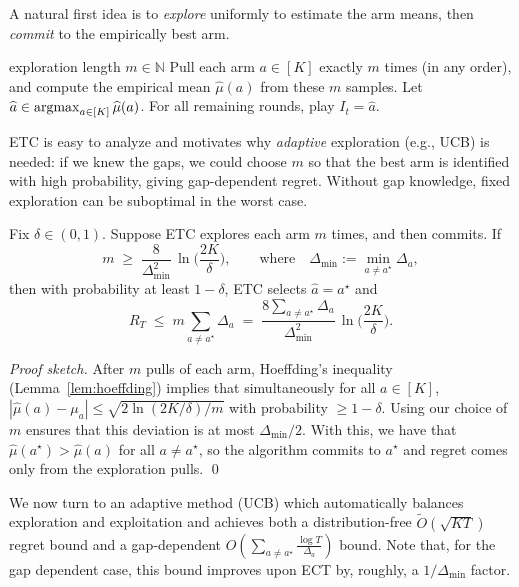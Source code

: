 A natural first idea is to \emph{explore} uniformly to estimate the arm means,
then \emph{commit} to the empirically best arm.

\begin{algorithm}[t]
\begin{algorithmic}[1]
\Require exploration length $m\in\mathbb{N}$
\State Pull each arm $a\in[K]$ exactly $m$ times (in any order), and compute the empirical mean $\widehat\mu(a)$ from these $m$ samples.
\State Let $\widehat a \in \operatorname*{argmax}_{a\in[K]}\widehat\mu(a)$.
\State For all remaining rounds, play $I_t=\widehat a$.
\end{algorithmic}
\caption{Explore--Then--Commit (ETC)}
\label{alg:etc}
\end{algorithm}

ETC is easy to analyze and motivates why \emph{adaptive} exploration (e.g., UCB)
is needed: if we knew the gaps, we could choose $m$ so that the best arm is
identified with high probability, giving gap-dependent regret. Without gap
knowledge, fixed exploration can be suboptimal in the worst case.

\begin{proposition}\label{prop:etc_gap}
Fix $\delta\in(0,1)$. Suppose ETC explores each arm $m$ times, and then commits.
If
\[
m \;\ge\; \frac{8}{\Delta_{\min}^2}\,\ln\!\Big(\frac{2K}{\delta}\Big),
\qquad\text{where}\quad
\Delta_{\min}:=\min_{a\neq a^\star}\Delta_a,
\]
then with probability at least $1-\delta$, ETC selects $\widehat a=a^\star$ and
\[
R_T \;\le\; m\sum_{a\neq a^\star}\Delta_a
\;=\;
\frac{8 \sum_{a\neq a^\star}\Delta_a}{\Delta_{\min}^2}\,\ln\!\Big(\frac{2K}{\delta}\Big).
\]
\end{proposition}

\noindent
\emph{Proof sketch.} After $m$ pulls of each arm, Hoeffding's inequality
(Lemma~\ref{lem:hoeffding}) implies that simultaneously for all $a\in[K]$,
$|\widehat\mu(a)-\mu_a|\le \sqrt{2\ln(2K/\delta)/m}$ with probability $\ge 1-\delta$.
Using our choice of $m$ ensures that this deviation is at most
$\Delta_{\min}/2$. With this, we have that $\widehat\mu(a^\star)>\widehat\mu(a)$
for all $a\neq a^\star$, so the algorithm commits to $a^\star$ and regret comes only
from the exploration pulls. \qed

\medskip

We now turn to an adaptive method (UCB) which automatically balances exploration
and exploitation and achieves both a distribution-free $\tilde O(\sqrt{KT})$
regret bound and a gap-dependent $O(\sum_{a\neq a^\star}\tfrac{\log T}{\Delta_a})$
bound. Note that, for the gap dependent case, this bound improves upon
ECT by, roughly, a $1/\Delta_{\min}$ factor.

